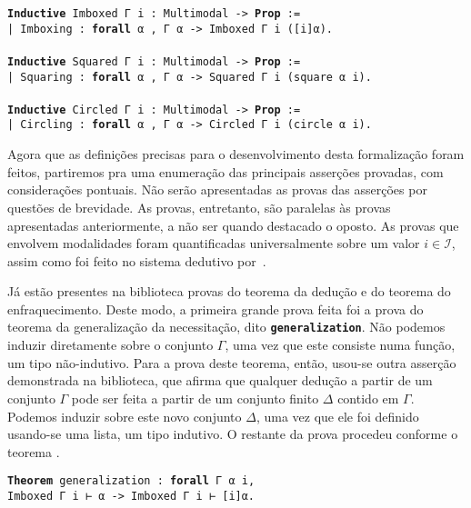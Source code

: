 \vspace{\baselineskip}
\begin{tcolorbox}[enhanced jigsaw, breakable, sharp corners, colframe=black, colback=white, boxrule=0.5pt, left=1.5mm, right=1.5mm, top=1.5mm, bottom=1.5mm]
\noindent
\texttt
{\noindent\footnotesize\textbf{Inductive} Imboxed Γ i : Multimodal -> \textbf{Prop} :=\\
| Imboxing : \textbf{forall} α , Γ α  -> Imboxed Γ i ([i]α).
\\
\\
\textbf{Inductive} Squared Γ i : Multimodal -> \textbf{Prop} :=\\
| Squaring : \textbf{forall} α , Γ α  -> Squared Γ i (square α i).
\\
\\
\textbf{Inductive} Circled Γ i : Multimodal -> \textbf{Prop} :=\\
| Circling : \textbf{forall} α , Γ α  -> Circled Γ i (circle α i).
}
\end{tcolorbox}
\vspace{.5\baselineskip}
Agora que as definições precisas para o desenvolvimento desta formalização foram feitos, partiremos pra uma enumeração das principais asserções provadas, com considerações pontuais.
Não serão apresentadas as provas das asserções por questões de brevidade.
As provas, entretanto, são paralelas às provas apresentadas anteriormente, a não ser quando destacado o oposto.
As provas que envolvem modalidades foram quantificadas universalmente sobre um valor $i\in\mathcal{I}$, assim como foi feito no sistema dedutivo por~\cite{Nunes}.

\vspace{.3\baselineskip}
Já estão presentes na biblioteca provas do teorema da dedução e do teorema do enfraquecimento.
Deste modo, a primeira grande prova feita foi a prova do teorema da generalização da necessitação, dito \texttt{\footnotesize\textbf{generalization}}.
Não podemos induzir diretamente sobre o conjunto $\Gamma$, uma vez que este consiste numa função, um tipo não-indutivo.
Para a prova deste teorema, então, usou-se outra asserção demonstrada na biblioteca, que afirma que qualquer dedução a partir de um conjunto $\Gamma$ pode ser feita a partir de um conjunto finito $\Delta$ contido em $\Gamma$.
Podemos induzir sobre este novo conjunto $\Delta$, uma vez que ele foi definido usando-se uma lista, um tipo indutivo.
O restante da prova procedeu conforme o teorema .

\vspace{\baselineskip}
\begin{tcolorbox}[enhanced jigsaw, breakable, sharp corners, colframe=black, colback=white, boxrule=0.5pt, left=1.5mm, right=1.5mm, top=1.5mm, bottom=1.5mm]
\texttt{\noindent\footnotesize\textbf{Theorem} generalization : \textbf{forall} Γ α i,\\Imboxed Γ i ⊢ α -> Imboxed Γ i ⊢ [i]α.}
\end{tcolorbox}

